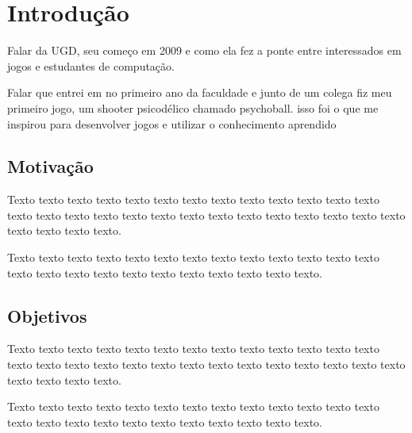\chapter{Introdução}
\label{cap:introducao}

    Falar da UGD, seu começo em 2009 e como ela fez a ponte entre interessados em jogos e estudantes de computação.

    Falar que entrei em no primeiro ano da faculdade e junto de um colega fiz meu primeiro jogo, um shooter psicodélico chamado psychoball.
    isso foi o que me inspirou para desenvolver jogos e utilizar o conhecimento aprendido


\section{Motivação}
\label{sec:motivacao}

    Texto texto texto texto texto texto texto texto texto texto texto texto
    texto texto texto texto texto texto texto texto texto texto texto texto
    texto texto texto texto texto texto texto.

    Texto texto texto texto texto texto texto texto texto texto texto texto
    texto texto texto texto texto texto texto texto texto texto texto texto.


\section{Objetivos}
\label{sec:objetivo}

    Texto texto texto texto texto texto texto texto texto texto texto texto
    texto texto texto texto texto texto texto texto texto texto texto texto
    texto texto texto texto texto texto texto.

    Texto texto texto texto texto texto texto texto texto texto texto texto
    texto texto texto texto texto texto texto texto texto texto texto texto.

